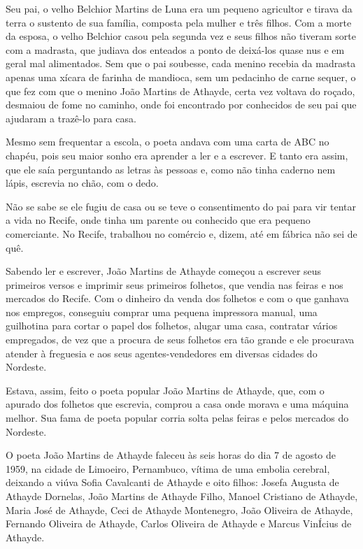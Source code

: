 \documentclass{extarticle}
\begin{document}
Seu pai, o velho Belchior Martins de Luna era um pequeno agricultor e
tirava da terra o sustento de sua família, composta pela mulher e três
filhos. Com a morte da esposa, o velho Belchior casou pela segunda vez e
seus filhos não tiveram sorte com a madrasta, que judiava dos enteados a
ponto de deixá-los quase nus e em geral mal alimentados. Sem que o pai
soubesse, cada menino recebia da madrasta apenas uma xícara de farinha
de mandioca, sem um pedacinho de carne sequer, o que fez com que o
menino João Martins de Athayde, certa vez voltava do roçado, desmaiou de
fome no caminho, onde foi encontrado por conhecidos de seu pai que
ajudaram a trazê-lo para casa.

Mesmo sem frequentar a escola, o poeta andava com uma carta de ABC no
chapéu, pois seu maior sonho era aprender a ler e a escrever. E tanto
era assim, que ele saía perguntando as letras às pessoas e, como não
tinha caderno nem lápis, escrevia no chão, com o dedo.

Não se sabe se ele fugiu de casa ou se teve o consentimento do pai para
vir tentar a vida no Recife, onde tinha um parente ou conhecido que era
pequeno comerciante. No Recife, trabalhou no comércio e, dizem, até em
fábrica não sei de quê.

Sabendo ler e escrever, João Martins de Athayde começou a escrever seus
primeiros versos e imprimir seus primeiros folhetos, que vendia nas
feiras e nos mercados do Recife. Com o dinheiro da venda dos folhetos e
com o que ganhava nos empregos, conseguiu comprar uma pequena impressora
manual, uma guilhotina para cortar o papel dos folhetos, alugar uma
casa, contratar vários empregados, de vez que a procura de seus folhetos
era tão grande e ele procurava atender à freguesia e aos seus
agentes-vendedores em diversas cidades do Nordeste.

Estava, assim, feito o poeta popular João Martins de Athayde, que, com o
apurado dos folhetos que escrevia, comprou a casa onde morava e uma
máquina melhor. Sua fama de poeta popular corria solta pelas feiras e
pelos mercados do Nordeste.

O poeta João Martins de Athayde faleceu às seis horas do dia 7 de agosto
de 1959, na cidade de Limoeiro, Pernambuco, vítima de uma embolia
cerebral, deixando a viúva Sofia Cavalcanti de Athayde e oito filhos:
Josefa Augusta de Athayde Dornelas, João Martins de Athayde Filho,
Manoel Cristiano de Athayde, Maria José de Athayde, Ceci de Athayde
Montenegro, João Oliveira de Athayde, Fernando Oliveira de Athayde,
Carlos Oliveira de Athayde e Marcus VinÍcius de Athayde.
\end{document}
